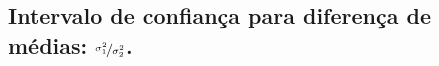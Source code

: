 \documentclass[9pt]{beamer}
\begin{document}
%
%
%
%	
%	
%
%

\subsection{Intervalo de confiança para diferença de médias: $\nicefrac{\sigma_1^2}{\sigma_2^2}$.}
\end{document}
